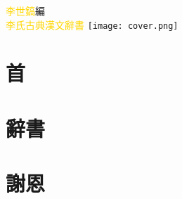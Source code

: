 \documentclass[a5paper,11pt]{report}
\begin{document}
\begin{titlepage}
\doublespacing
\hfill
\vfill
{\textcolor{gold}{李世鎬}\hspace{14pt}編}\\
{\huge\textcolor{gold}{李氏古典漢文辭書}}
\vspace{400mm}
\hspace{-30mm}
\texttt{[image: cover.png]}
\vspace{64pt}
\addtolength{\rightmargin}{20mm}
\addtolength{\leftmargin}{20mm}
\end{titlepage}
\newpage
\chapter*{首}
\doublespacing


\chapter*{辭書}
\begin{multicols}{2}
\begin{flushleft}
\onehalfspacing

\end{flushleft}
\end{multicols}

\chapter*{謝恩}
\doublespacing

\end{document}
